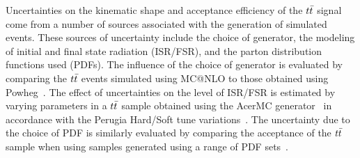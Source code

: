 


Uncertainties on the kinematic shape and acceptance efficiency of the $t\bar{t}$ signal
come from a number of sources associated with the generation of simulated events.
These sources of uncertainty include the choice of generator, the modeling of
initial and final state radiation (ISR/FSR), and the parton distribution
functions used (PDFs).
The influence of the choice of generator is evaluated by comparing the $t\bar{t}$ 
events simulated using {\sc MC@NLO} to those obtained using {\sc Powheg}~\cite{powheg,Frixione:2007vw,Alioli:2010xd}.
The effect of uncertainties on the level of ISR/FSR is estimated by varying
parameters in a $t\bar{t}$ sample obtained using the {\sc AcerMC} generator~\cite{Acer}
in accordance with the Perugia Hard/Soft tune variations~\cite{Skands}.
The uncertainty due to the choice of PDF is similarly evaluated by comparing the acceptance
of the $t\bar{t}$ sample when using samples generated using a range of PDF sets~\cite{Pumplin:2002vw}.

